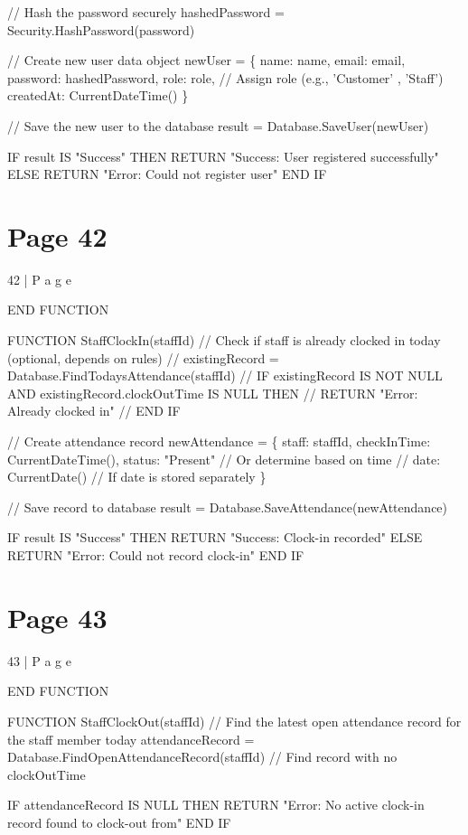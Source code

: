 \documentclass{article}
\begin{document}
    // Hash the password securely 
    hashedPassword = Security.HashPassword(password) 
 
    // Create new user data object 
    newUser = \{ 
        name: name, 
        email: email, 
        password: hashedPassword, 
        role: role, // Assign role (e.g., 'Customer' , 'Staff') 
        createdAt: CurrentDateTime() 
    \} 
 
    // Save the new user to the database 
    result = Database.SaveUser(newUser) 
 
    IF result IS "Success" THEN 
        RETURN "Success: User registered successfully" 
    ELSE 
        RETURN "Error: Could not register user" 
    END IF 

\section*{Page 42}
42 | P a g e 
 
 
END FUNCTION 
 
FUNCTION StaffClockIn(staffId) 
    // Check if staff is already clocked in today (optional, depends on rules) 
    // existingRecord = Database.FindTodaysAttendance(staffId) 
    // IF existingRecord IS NOT NULL AND existingRecord.clockOutTime IS NULL THEN 
    //   RETURN "Error: Already clocked in" 
    // END IF 
 
    // Create attendance record 
    newAttendance = \{ 
        staff: staffId, 
        checkInTime: CurrentDateTime(), 
        status: "Present" // Or determine based on time 
        // date: CurrentDate() // If date is stored separately 
    \} 
 
    // Save record to database 
    result = Database.SaveAttendance(newAttendance) 
 
    IF result IS "Success" THEN 
        RETURN "Success: Clock-in recorded" 
    ELSE 
        RETURN "Error: Could not record clock-in" 
    END IF 

\section*{Page 43}
43 | P a g e 
 
 
END FUNCTION 
 
 
FUNCTION StaffClockOut(staffId) 
    // Find the latest open attendance record for the staff member today 
    attendanceRecord = Database.FindOpenAttendanceRecord(staffId) // Find record with 
no clockOutTime 
 
    IF attendanceRecord IS NULL THEN 
        RETURN "Error: No active clock-in record found to clock-out from" 
    END IF 
 
\end{document}
